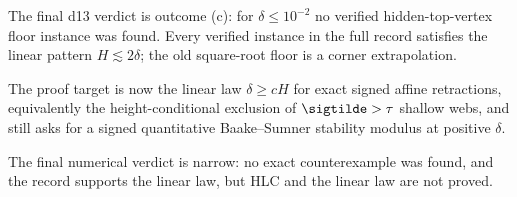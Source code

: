 \begin{remark}
\numbadge The final d13 verdict is outcome (c): for
\(\delta\le10^{-2}\) no verified hidden-top-vertex floor instance was found.
Every verified instance in the full record satisfies the linear pattern
\(H\lesssim2\delta\); the old square-root floor is a corner extrapolation.
\end{remark}

\begin{openproblem}
\openbadge The proof target is now the linear law \(\delta\ge cH\) for exact
signed affine retractions, equivalently the height-conditional exclusion of
\(\sigtilde>\tau\) shallow webs, and still asks for a signed quantitative
Baake--Sumner stability modulus at positive \(\delta\).
\end{openproblem}
The final numerical verdict is narrow: no exact counterexample was found, and the record supports the linear law, but HLC and the linear law are not proved.
